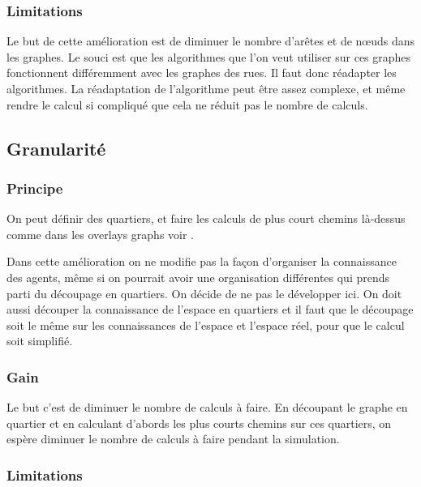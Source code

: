 \documentclass[a4paper]{article}
\begin{document}

    \subsubsection{Limitations}

Le but de cette amélioration est de diminuer le nombre d'arêtes et de nœuds dans
les graphes. Le souci est que les algorithmes que l'on veut utiliser sur ces
graphes fonctionnent différemment avec les graphes des rues. Il faut donc
réadapter les algorithmes. La réadaptation de l'algorithme peut être assez
complexe, et même rendre le calcul si compliqué que cela ne réduit pas le nombre
de calculs.

  \subsection{Granularité}

    \subsubsection{Principe}

On peut définir des quartiers, et faire les calculs de plus court chemins
là-dessus comme dans les overlays graphs voir \cite{holzer2009}.

Dans cette amélioration on ne modifie pas la façon d'organiser la connaissance
des agents, même si on pourrait avoir une organisation différentes  qui prends
parti du découpage en quartiers. On décide de ne pas le développer ici. On doit
aussi découper la connaissance de l'espace en quartiers et il faut que le
découpage soit le même sur les connaissances de l'espace et l'espace réel, pour
que le calcul soit simplifié.

    \subsubsection{Gain}

Le but c'est de diminuer le nombre de calculs à faire. En découpant le graphe en
quartier et en calculant d'abords les plus courts chemins sur ces quartiers, on
espère diminuer le nombre de calculs à faire pendant la simulation.

    \subsubsection{Limitations}
\end{document}
